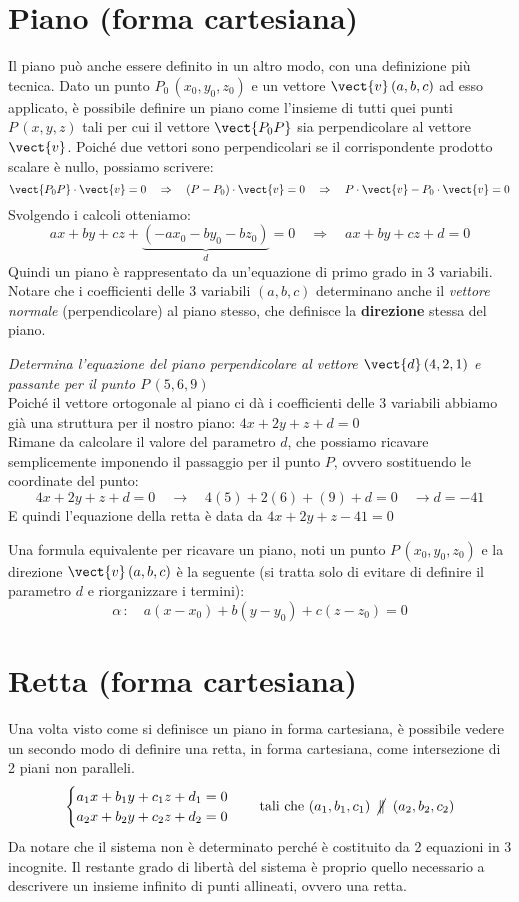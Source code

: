 \section{Piano (forma cartesiana)}
Il piano può anche essere definito in un altro modo, con una definizione più tecnica. Dato un punto $P_0\,(x_0,y_0,z_0)$ e un vettore $\vect{v}\,(a,b,c)$ ad esso applicato, è possibile definire un piano come l'insieme di tutti quei punti $P\,(x,y,z)$ tali per cui il vettore $\vect{P_0P}$ sia perpendicolare al vettore $\vect{v}$. Poiché due vettori sono perpendicolari se il corrispondente prodotto scalare è nullo, possiamo scrivere:
\[\vect{P_0P} \cdot \vect{v} =0 \quad \Rightarrow \quad (P-P_0)\cdot \vect{v}=0 \quad \Rightarrow \quad P \cdot \vect{v}-P_0\cdot \vect{v}=0\]
Svolgendo i calcoli otteniamo:
\[ a x+by+cz + \underbrace{(-a x_0-by_0-bz_0)}_{d}=0 \quad \Rightarrow \quad \boxed{ax+by+cz+d=0}\]
Quindi un piano è rappresentato da un'equazione di primo grado in 3 variabili. Notare che i coefficienti delle 3 variabili $(a,b,c)$ determinano anche il \emph{vettore normale} (perpendicolare) al piano stesso, che definisce la \textbf{direzione} stessa del piano. 
\begin{esempio}
 \emph{Determina l'equazione del piano perpendicolare al vettore $\vect{d} \, (4,2,1)$ e passante per il punto $P\, (5,6,9)$}\\[5pt]
Poiché il vettore ortogonale al piano ci dà i coefficienti delle 3 variabili abbiamo già una struttura per il nostro piano: \(4x+2y+z +d=0\)\\[3pt]
Rimane da calcolare il valore del parametro $d$, che possiamo ricavare semplicemente imponendo il passaggio per il punto $P$, ovvero sostituendo le coordinate del punto:
\[4x+2y+z+d=0 \quad \longrightarrow \quad 4 (5)+2 (6)+(9)+d=0 \quad \rightarrow d = -41\]
E quindi l'equazione della retta è data da \(4x+2y+z-41=0\)
\end{esempio}
Una formula equivalente per ricavare un piano, noti un punto $P\,(x_0,y_0,z_0)$ e la direzione $\vect{v}\,(a,b,c)$ è la seguente (si tratta solo di evitare di definire il parametro $d$ e riorganizzare i termini):
\[ \alpha \,: \quad \boxed{a(x-x_0)+b(y-y_0)+c(z-z_0)=0}\]

\section{Retta (forma cartesiana)}

Una volta visto come si definisce un piano in forma cartesiana, è possibile vedere un secondo modo di definire una retta, in forma cartesiana, come intersezione di 2 piani non paralleli.
\[\begin{cases}
a_1 x+b_1y+c_1 z+d_1 = 0 \\
a_2 x+b_2y+c_2 z+d_2 = 0
\end{cases} \quad \text{tali che } (a_1,b_1,c_1) \;\; \cancel{\parallel}\;\; (a_2,b_2,c_2)\]
Da notare che il sistema non è determinato perché è costituito da 2 equazioni in 3 incognite. Il restante grado di libertà del sistema è proprio quello necessario a descrivere un insieme infinito di punti allineati, ovvero una retta.


